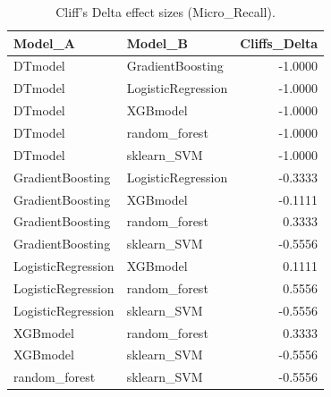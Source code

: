 \begin{table}[t]
\centering
\begin{tabular}{llr}
\toprule
Model_A & Model_B & Cliffs_Delta \\
\midrule
DTmodel & GradientBoosting & -1.0000 \\
DTmodel & LogisticRegression & -1.0000 \\
DTmodel & XGBmodel & -1.0000 \\
DTmodel & random_forest & -1.0000 \\
DTmodel & sklearn_SVM & -1.0000 \\
GradientBoosting & LogisticRegression & -0.3333 \\
GradientBoosting & XGBmodel & -0.1111 \\
GradientBoosting & random_forest & 0.3333 \\
GradientBoosting & sklearn_SVM & -0.5556 \\
LogisticRegression & XGBmodel & 0.1111 \\
LogisticRegression & random_forest & 0.5556 \\
LogisticRegression & sklearn_SVM & -0.5556 \\
XGBmodel & random_forest & 0.3333 \\
XGBmodel & sklearn_SVM & -0.5556 \\
random_forest & sklearn_SVM & -0.5556 \\
\bottomrule
\end{tabular}
\caption{Cliff's Delta effect sizes (Micro_Recall).}
\label{tab:cliffs_Micro_Recall}
\end{table}
